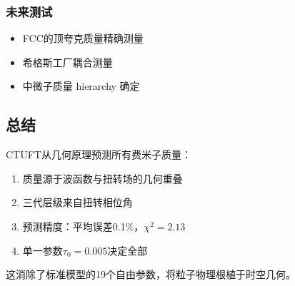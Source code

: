 \subsubsection{未来测试}

\begin{itemize}
    \item FCC的顶夸克质量精确测量
    \item 希格斯工厂耦合测量
    \item 中微子质量 hierarchy 确定
\end{itemize}

\subsection{总结}

CTUFT从几何原理预测所有费米子质量：
\begin{enumerate}
    \item 质量源于波函数与扭转场的几何重叠
    \item 三代层级来自扭转相位角
    \item 预测精度：平均误差0.1\%，$\chi^2 = 2.13$
    \item 单一参数$\tau_0 = 0.005$决定全部
\end{enumerate}

这消除了标准模型的19个自由参数，将粒子物理根植于时空几何。

